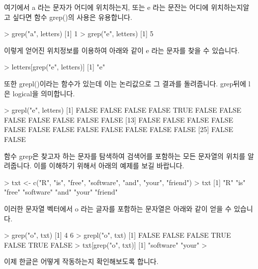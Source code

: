\documentclass[tutorial.tex]{subfiles}
\begin{document}
여기에서 a 라는 문자가 어디에 위치하는지, 또는 e 라는 문잔는 어디에 위치하는지알고 싶다면 함수 grep()의 사용은 유용합니다.
\begin{Schunk}
\begin{Soutput} 
> grep("a", letters)
[1] 1
> grep("e", letters)
[1] 5
\end{Soutput}
\end{Schunk}
이렇게 얻어진 위치정보를 이용하여 아래와 같이 e 라는 문자를 찾을 수 있습니다. 

\begin{Schunk}
\begin{Soutput} 
> letters[grep("e", letters)]
[1] "e"
\end{Soutput}
\end{Schunk}

또한 grepl()이라는 함수가 있는데 이는 논리값으로 그 결과를 돌려줍니다. 
grep뒤에 l은 logical을 의미합니다.

\begin{Schunk}
\begin{Soutput} 
> grepl("e", letters)
 [1] FALSE FALSE FALSE FALSE  TRUE FALSE FALSE FALSE FALSE FALSE FALSE FALSE
[13] FALSE FALSE FALSE FALSE FALSE FALSE FALSE FALSE FALSE FALSE FALSE FALSE
[25] FALSE FALSE
\end{Soutput}
\end{Schunk}


함수 grep은 찾고자 하는 문자를 탐색하여 검색어를 포함하는 모든 문자열의 위치를 알려줍니다.
이를 이해하기 위해서 아래의 예제를 보길 바랍니다.

\begin{Schunk}
\begin{Soutput} 
> txt <- c("R", "is", "free", "software", "and", "your", "friend")
> txt
[1] "R"        "is"       "free"     "software" "and"      "your"     "friend"  
\end{Soutput}
\end{Schunk}

이러한 문자열 벡터에서 o 라는 글자를 포함하는 문자열은 아래와 같이 얻을 수 있습니다. 

\begin{Schunk}
\begin{Soutput} 
> grep("o", txt)
[1] 4 6
> grepl("o", txt)
[1] FALSE FALSE FALSE  TRUE FALSE  TRUE FALSE
> txt[grep("o", txt)]
[1] "software" "your"    
> 
\end{Soutput}
\end{Schunk}

이제 한글은 어떻게 작동하는지 확인해보도록 합니다. 
\end{document}
